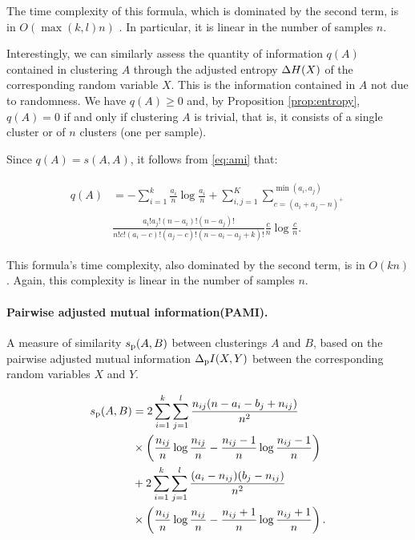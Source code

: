 The time complexity of this formula, which is dominated by the second term, is in $O(\max(k,l)n)$ \cite{romano2014standardized}. In particular, it is linear in the number of samples $n$.

Interestingly, we can similarly assess the quantity of information $q(A)$ contained in clustering $A$ through the adjusted entropy $\Delta H(X)$ of the corresponding random variable $X$. This is the information contained in $A$  not due to randomness. 
We have $q(A) \ge 0$ and, 
by Proposition \ref{prop:entropy}, $q(A) = 0$  if and only if clustering $A$ is trivial, that is, it consists of  a single cluster or of $n$ clusters (one per sample).

Since $q(A) = s(A, A)$, it follows from  \eqref{eq:ami} that:

\begin{align}\label{eq:q}
\begin{split}
q(A)&= -\sum_{i=1}^k \frac {a_i}n \log \frac {a_i}n + \sum_{i,j=1}^K \sum_{c = (a_i+a_j-n)^+}^{\min(a_i, a_j)} \\
&\frac{a_i!a_j!(n-a_i)!(n-a_j)!}
{n!c!(a_i-c)!(a_j-c)!(n-a_i-a_j+k)!}\frac {c}n \log \frac {c}n.
\end{split}
\end{align}

This formula's time complexity, also dominated by the second term, is in $O(kn)$. Again,  this complexity is linear in the number of samples $n$. 

\paragraph{Pairwise adjusted mutual information(PAMI).} 
A measure of similarity $s_{\rm p}(A,B)$ between clusterings $A$ and $B$, based on  the pairwise adjusted mutual information $\Delta_{\rm p}I(X,Y)$ between the corresponding random variables $X$ and $Y$. 

\begin{align}\label{eq:pami}
\begin{split}
s_{\rm p}(A,B) &=2 \sum_{i=1}^k \sum_{j=1}^l \frac{n_{ij}(n -a_i -b_j + n_{ij})}{n^2}\\
&\times  \left(\frac{n_{ij}} n \log\frac{n_{ij}}n - \frac{n_{ij} - 1} n \log\frac{n_{ij} - 1}n\right)\\
& + 2\sum_{i=1}^k \sum_{j=1}^l \frac{(a_i - n_{ij})(b_j - n_{ij})}{n^2}\\
&\times\left(\frac{n_{ij}} n \log\frac{n_{ij}}n - \frac{n_{ij} + 1} n \log\frac{n_{ij} + 1}n \right).
\end{split}
\end{align}


